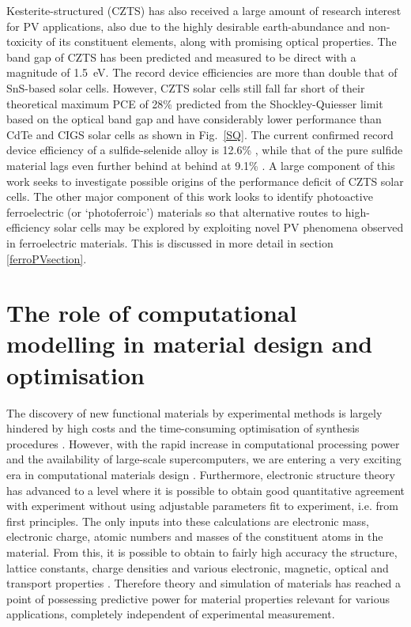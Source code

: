 \documentclass[11pt, twoside]{report}
\begin{document}
Kesterite-structured {\CZTS} (CZTS) has also received a large amount of research interest for PV applications, also due to the highly desirable earth-abundance and non-toxicity of its constituent elements, along with promising optical properties. The band gap of CZTS has been predicted \cite{CZTS_bandgap_theory} and measured \cite{CZTS_bandgap_exp} to be direct with a magnitude of \SI{1.5}{eV}. 
The record device efficiencies are more than double that of SnS-based solar cells. However, CZTS solar cells still fall far short of their theoretical maximum PCE of 28\% predicted from the Shockley-Quiesser limit based on the optical band gap and have considerably lower performance than CdTe and CIGS solar cells as shown in Fig.~\ref{SQ}. The current confirmed record device efficiency of a sulfide-selenide alloy is 12.6\% \cite{Mitzi2017_rev_21}, while that of the pure sulfide material lags even further behind at behind at 9.1\% \cite{CZTS_record}. A large component of this work seeks to investigate possible origins of the performance deficit of CZTS solar cells. The other major component of this work looks to identify photoactive ferroelectric (or `photoferroic') materials so that alternative routes to high-efficiency solar cells may be explored by exploiting novel PV phenomena observed in ferroelectric materials. This is discussed in more detail in section \ref{ferroPVsection}. 


\section{The role of computational modelling in material design and optimisation}
The discovery of new functional materials by experimental methods is largely hindered by high costs and the time-consuming optimisation of synthesis procedures \cite{high_tp}.
However, with the rapid increase in computational processing power and the availability of large-scale supercomputers, we are entering a very exciting era in computational materials design \cite{WMD_material_design_review}. Furthermore, electronic structure theory has advanced to a level where it is possible to obtain good quantitative agreement with experiment without using adjustable parameters fit to experiment, i.e. from first principles. The only inputs into these calculations are electronic mass, electronic charge, atomic numbers and masses of the constituent atoms in the material. From this, it is possible to obtain to fairly high accuracy the structure, lattice constants, charge densities and various electronic, magnetic, optical and transport properties \cite{RichardMartin_Ch1}. Therefore theory and simulation of materials has reached a point of possessing predictive power for material properties relevant for various applications, completely independent of experimental measurement.
\end{document}
